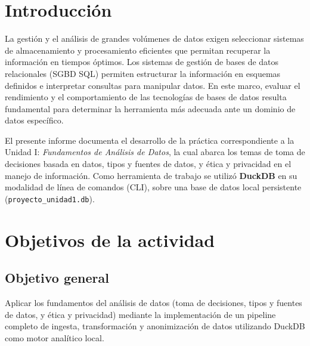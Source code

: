 \documentclass[12pt,letterpaper]{article}
\begin{document}
\newpage
{} %

\tableofcontents %
\newpage

\listoffigures %
\newpage


\section{Introducción}
La gestión y el análisis de grandes volúmenes de datos exigen seleccionar sistemas de almacenamiento y procesamiento eficientes que permitan recuperar la información en tiempos óptimos. \cite{barrionuevo-2023} Los sistemas de gestión de bases de datos relacionales (SGBD SQL) permiten estructurar la información en esquemas definidos e interpretar consultas para manipular datos. \cite{barrionuevo-2023} En este marco, evaluar el rendimiento y el comportamiento de las tecnologías de bases de datos resulta fundamental para determinar la herramienta más adecuada ante un dominio de datos específico.

El presente informe documenta el desarrollo de la práctica correspondiente a la
Unidad I: \textit{Fundamentos de Análisis de Datos}, la cual abarca los temas de
toma de decisiones basada en datos, tipos y fuentes de datos, y ética y
privacidad en el manejo de información. Como herramienta de trabajo se utilizó
\textbf{DuckDB} en su modalidad de línea de comandos (CLI), sobre una base de
datos local persistente (\texttt{proyecto\_unidad1.db}).


\section{Objetivos de la actividad}
\subsection{Objetivo general}
Aplicar los fundamentos del análisis de datos (toma de decisiones, tipos y
fuentes de datos, y ética y privacidad) mediante la implementación de un
pipeline completo de ingesta, transformación y anonimización de datos
utilizando DuckDB como motor analítico local.
 
\end{document}

